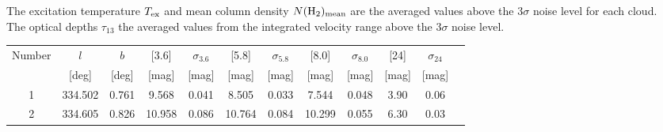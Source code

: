 \documentclass[onecolumn]{pasj01}
\begin{document}
{{{{{{\begin{table*}
{
\label{tab:first}
\begin{tabnote}
The excitation temperature $T_{\rm ex}$ and mean column density $N({\rm H_2})_{\rm mean}$ are the averaged values above the $3\sigma$ noise level for each cloud.\\
The optical depths $\tau_{13}$ the averaged values from the integrated velocity range above the $3\sigma$ noise level.
\end{tabnote}
}
\end{table*}

{
{
\begin{table*}
{{
{
\begin{tabular}{cccccccccccc}
\hline
\multicolumn{1}{c}{Number} & $l$&$b$  & [3.6] &$\sigma_{3.6}$ &  [5.8] &$\sigma_{5.8}$ & [8.0] &$\sigma_{8.0}$& [24] &$\sigma_{24}$\\
& [deg] &[deg]  & [mag] & [mag] &  [mag] & [mag] & [mag] & [mag] & [mag] & [mag]\\
\hline
1	& 334.502	& 0.761  & 9.568 & 0.041 & 8.505 & 0.033  & 7.544	&0.048 & 3.90 &0.06	\\
2	& 334.605	& 0.826 & 10.958 & 0.086  & 10.764 & 0.084 & 10.299 & 0.055& 6.30 & 0.03	\\
\hline
\end{tabular}}\label{tab:first}
\begin{tabnote}
\end{tabnote}
}}
\end{table*}}}



}}}}}}
\end{document}
